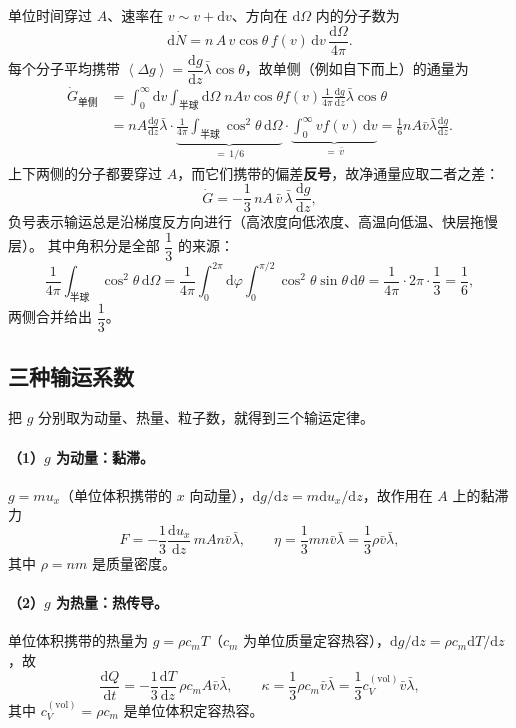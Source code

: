 \documentclass[11pt,a4paper,openany]{ctexbook}
\newcommand{\dd}{\mathrm d}
\newcommand{\avg}[1]{\left\langle #1\right\rangle}
\begin{document}
单位时间穿过 $A$、速率在 $v\sim v+\dd v$、方向在 $\dd\Omega$ 内的分子数为
\[
\dd\dot N=n\,A\,v\cos\theta\,f(v)\,\dd v\,\frac{\dd\Omega}{4\pi}.
\]
每个分子平均携带 $\avg{\Delta g}=\dfrac{\dd g}{\dd z}\bar\lambda\cos\theta$，故单侧（例如自下而上）的通量为
\[
\begin{aligned}
\dot G_{\text{单侧}}
&=\int_0^{\infty}\!\!\dd v\int_{\text{半球}}\!\!\dd\Omega\;
nAv\cos\theta f(v)\frac{1}{4\pi}\frac{\dd g}{\dd z}\bar\lambda\cos\theta\\
&=nA\frac{\dd g}{\dd z}\bar\lambda\cdot
\underbrace{\frac{1}{4\pi}\int_{\text{半球}}\cos^2\theta\,\dd\Omega}_{=\,1/6}
\cdot\underbrace{\int_0^\infty vf(v)\,\dd v}_{=\,\bar v}
=\frac16 nA\bar v\bar\lambda\frac{\dd g}{\dd z}.
\end{aligned}
\]
上下两侧的分子都要穿过 $A$，而它们携带的偏差\textbf{反号}，故净通量应取二者之差：
\[
\boxed{\dot G=-\frac13\,nA\,\bar v\,\bar\lambda\,\frac{\dd g}{\dd z}} ,
\]
负号表示输运总是沿梯度反方向进行（高浓度向低浓度、高温向低温、快层拖慢层）。
其中角积分是全部 $\dfrac13$ 的来源：
\[
\frac{1}{4\pi}\int_{\text{半球}}\cos^2\theta\,\dd\Omega
=\frac{1}{4\pi}\int_0^{2\pi}\!\!\dd\varphi\int_0^{\pi/2}\!\cos^2\theta\sin\theta\,\dd\theta
=\frac{1}{4\pi}\cdot2\pi\cdot\frac13=\frac16,
\]
两侧合并给出 $\dfrac13$。

\subsection*{三种输运系数}

把 $g$ 分别取为动量、热量、粒子数，就得到三个输运定律。

\paragraph{（1）$g$ 为动量：黏滞。}
$g=mu_x$（单位体积携带的 $x$ 向动量），$\dd g/\dd z=m\dd u_x/\dd z$，故作用在 $A$ 上的黏滞力
\[
F=-\frac13\frac{\dd u_x}{\dd z}\,mAn\bar v\bar\lambda,
\qquad
\boxed{\eta=\frac13 mn\bar v\bar\lambda=\frac13\rho\bar v\bar\lambda},
\]
其中 $\rho=nm$ 是质量密度。

\paragraph{（2）$g$ 为热量：热传导。}
单位体积携带的热量为 $g=\rho c_mT$（$c_m$ 为单位质量定容热容），$\dd g/\dd z=\rho c_m\dd T/\dd z$，故
\[
\frac{\dd Q}{\dd t}=-\frac13\frac{\dd T}{\dd z}\,\rho c_mA\bar v\bar\lambda,
\qquad
\boxed{\kappa=\frac13\rho c_m\bar v\bar\lambda=\frac13c_V^{(\mathrm{vol})}\bar v\bar\lambda},
\]
其中 $c_V^{(\mathrm{vol})}=\rho c_m$ 是单位体积定容热容。
\end{document}
